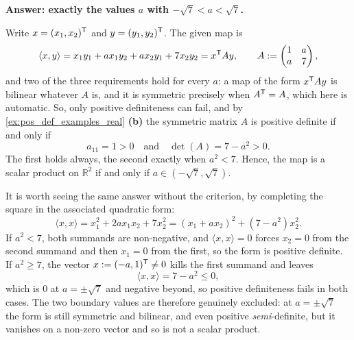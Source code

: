 \begin{exercisesolution*}
\label{sol:inner_product_parameter_a}
\textbf{Answer: exactly the values $a$ with $-\sqrt{7} < a < \sqrt{7}$.}

Write $x = (x_1, x_2)^{\mathsf{T}}$ and $y = (y_1, y_2)^{\mathsf{T}}$. The given map is
\[
    \langle x, y \rangle = x_1 y_1 + a x_1 y_2 + a x_2 y_1 + 7 x_2 y_2 = x^{\mathsf{T}} A y,
    \qquad A := \begin{pmatrix} 1 & a \\ a & 7 \end{pmatrix},
\]
and two of the three requirements hold for every $a$: a map of the form $x^{\mathsf{T}} A y$ is bilinear whatever $A$ is, and it is symmetric precisely when $A^{\mathsf{T}} = A$, which here is automatic. So, only positive definiteness can fail, and by \cref{ex:pos_def_examples_real} \textbf{(b)} the symmetric matrix $A$ is positive definite if and only if
\[
    a_{11} = 1 > 0 \quad \text{and} \quad \det(A) = 7 - a^2 > 0 .
\]
The first holds always, the second exactly when $a^2 < 7$. Hence, the map is a scalar product on $\mathbb{R}^2$ if and only if $a \in (-\sqrt{7}, \sqrt{7})$.

It is worth seeing the same answer without the criterion, by completing the square in the associated quadratic form:
\[
    \langle x, x \rangle = x_1^2 + 2a x_1 x_2 + 7 x_2^2 = (x_1 + a x_2)^2 + (7 - a^2) x_2^2 .
\]
If $a^2 < 7$, both summands are non-negative, and $\langle x, x \rangle = 0$ forces $x_2 = 0$ from the second summand and then $x_1 = 0$ from the first, so the form is positive definite. If $a^2 \ge 7$, the vector $x := (-a, 1)^{\mathsf{T}} \ne 0$ kills the first summand and leaves
\[
    \langle x, x \rangle = 7 - a^2 \le 0,
\]
which is $0$ at $a = \pm\sqrt{7}$ and negative beyond, so positive definiteness fails in both cases. The two boundary values are therefore genuinely excluded: at $a = \pm\sqrt{7}$ the form is still symmetric and bilinear, and even positive \emph{semi}-definite, but it vanishes on a non-zero vector and so is not a scalar product.
\end{exercisesolution*}

